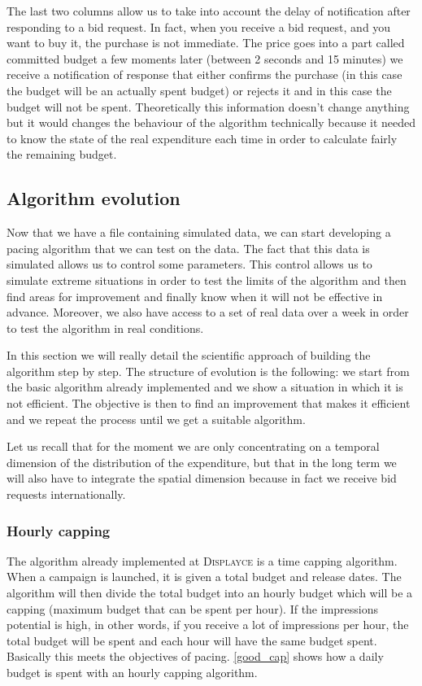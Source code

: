 \documentclass[12pt]{article}
\newcommand{\disp}{\textsc{Displayce}\xspace}
\begin{document}
The last two columns allow us to take into account the delay of notification after responding to a bid request. In fact, when you receive a bid request, and you want to buy it, the purchase is not immediate. The price goes into a part called committed budget a few moments later (between 2 seconds and 15 minutes) we receive a notification of response that either confirms the purchase (in this case the budget will be an actually spent budget) or rejects it and in this case the budget will not be spent. Theoretically this information doesn't change anything but it would changes the behaviour of the algorithm technically because it needed to know the state of the real expenditure each time in order to calculate fairly the remaining budget. \\

\subsection{Algorithm evolution}
Now that we have a file containing simulated data, we can start developing a pacing algorithm that we can test on the data. The fact that this data is simulated allows us to control some parameters. This control allows us to simulate extreme situations in order to test the limits of the algorithm and then find areas for improvement and finally know when it will not be effective in advance. Moreover, we also have access to a set of real data over a week in order to test the algorithm in real conditions. 

In this section we will really detail the scientific approach of building the algorithm step by step. The structure of evolution is the following: we start from the basic algorithm already implemented and we show a situation in which it is not efficient. The objective is then to find an improvement that makes it efficient and we repeat the process until we get a suitable algorithm. 

Let us recall that for the moment we are only concentrating on a temporal dimension of the distribution of the expenditure, but that in the long term we will also have to integrate the spatial dimension because in fact we receive bid requests internationally. 

\subsubsection{Hourly capping}

The algorithm already implemented at \disp is a time capping algorithm. When a campaign is launched, it is given a total budget and release dates. The algorithm will then divide the total budget into an hourly budget which will be a capping (maximum budget that can be spent per hour). If the impressions potential is high, in other words, if you receive a lot of impressions per hour, the total budget will be spent and each hour will have the same budget spent. Basically this meets the objectives of pacing. \autoref{good_cap} shows how a daily budget is spent with an hourly capping algorithm.   
\end{document}
